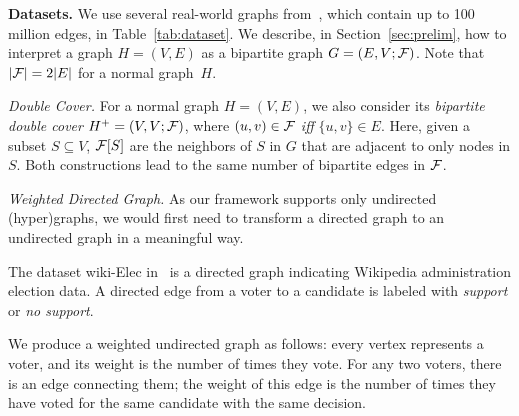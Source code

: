 




\noindent \textbf{Datasets.}
We use several real-world graphs from~\cite{snapnets}, which contain up to 100 million edges, in Table~\ref{tab:dataset}. 
We describe, in Section~\ref{sec:prelim},
how to interpret
a graph $H = (V, E)$
as a bipartite graph $G = (E, V; \mathcal {F})$.
Note that
$|\mathcal {F}| = 2 |E|$ for a normal graph~$H$.

\noindent \emph{Double Cover.} For a normal graph $H = (V, E)$,
we also consider its \emph{bipartite double cover}
$H^+ = (V, V; \mathcal {F})$, where $(u, v) \in \mathcal {F}$ \emph{iff}
$\{u, v\} \in E$.  Here, given a subset $S \subseteq V$,
$\mathcal {F}[S]$ are the neighbors of $S$ in $G$ 
that are adjacent to only nodes in $S$.  
Both constructions lead to the same number
of bipartite edges in $\mathcal {F}$.


	\noindent \emph{Weighted Directed Graph.} As our framework supports only undirected (hyper)graphs,
	we would first need to transform a directed graph to an undirected graph in a meaningful way.
	
	The dataset wiki-Elec in~\cite{snapnets} is a directed graph indicating Wikipedia administration election data. 	A directed edge from a voter to a candidate
	is labeled with \emph{support} or \emph{no support}.
	
	We produce a weighted undirected graph as follows: every vertex represents a voter, and its weight is the number of times they vote. For any two voters, there is an edge connecting them; the weight of this edge is the number of times they have voted for the same candidate with the same decision.




